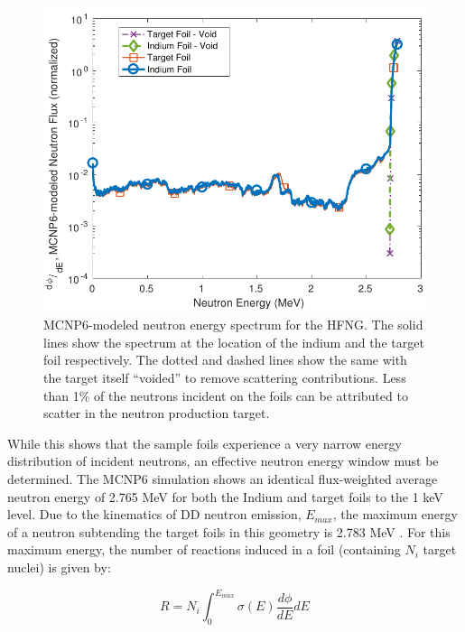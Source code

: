 \documentclass[5p]{elsarticle}
\newcommand{\comment}[1]{\todo[color=blue!20!white,inline]{ASV: #1}}
\begin{document}
\begin{figure}
 \centering
 \includegraphics[scale=0.6]{./figures/mcnp_flux_new.pdf}
 \caption{MCNP6-modeled neutron energy spectrum for the HFNG.  The solid lines show the spectrum at the location of the indium and the target foil respectively. The dotted and dashed lines show the same with the target itself \enquote{voided} to remove scattering contributions.  Less than 1\%  of the neutrons incident on the foils can be attributed to scatter in the neutron production target.}
 \label{fig:mcnp_flux}
\end{figure}





While this shows that the sample foils experience a very narrow energy distribution of incident neutrons, an effective neutron energy window must be determined. The MCNP6 simulation shows an identical flux-weighted average neutron energy of 2.765 MeV for both the Indium and target foils to the 1 keV level. Due to the kinematics of DD neutron emission, $E_{max}$,  the maximum energy of a neutron subtending the target foils in this geometry is 2.783 MeV \cite{Liskien_Paulsen_1973}. For this maximum energy, the number of reactions induced in a foil (containing $N_i$ target nuclei) is given by:

\begin{equation}
R = N_i \int_0^{E_{max}} \sigma(E) \dfrac{d\phi}{dE} dE
\end{equation}
\end{document}
